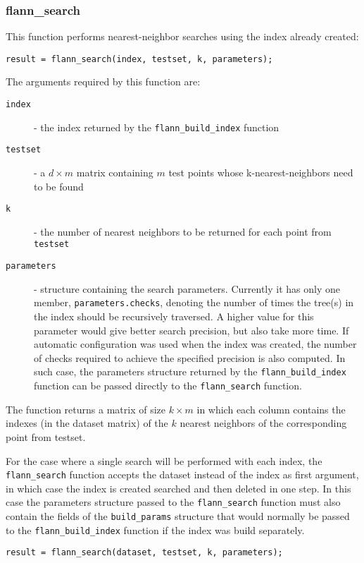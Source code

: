 \documentclass[letter,10pt]{article}
\begin{document}
\subsubsection{flann\_search}

This function performs nearest-neighbor searches using the index already
created:
\begin{Verbatim}
result = flann_search(index, testset, k, parameters);
\end{Verbatim}

The arguments required by this function are:
\begin{description}
\item[\texttt{index}] - the index returned by the
\texttt{flann\_build\_index} function
\item[\texttt{testset}] - a $d \times m$ matrix containing $m$ test points
whose k-nearest-neighbors need to be found
\item[\texttt{k}] - the number of nearest neighbors to be returned for each
point from \texttt{testset}
\item[\texttt{parameters}] - structure containing the search parameters.
Currently it has only one member, \texttt{parameters.checks}, denoting the
number of times the tree(s) in the index should be recursively traversed. A
higher value for this parameter would give better search precision, but
also take more time. If automatic configuration was used when the
index was created, the number of checks required to achieve the specified
precision is also computed. In such case, the parameters structure returned
by the \texttt{flann\_build\_index} function can be passed directly to the
\texttt{flann\_search} function.
\end{description}

The function returns a matrix of size $k \times m$ in which each column contains the indexes (in the dataset matrix) of the $k$ nearest neighbors of the corresponding point from testset.

For the case where a single search will be performed with each index, the
\texttt{flann\_search} function accepts the dataset instead of the index as
first argument, in which case the index is created searched and then
deleted in one step. In this case the parameters structure passed to the
\texttt{flann\_search} function must also contain the fields of the
\texttt{build\_params} structure that would normally be passed to the
\texttt{flann\_build\_index} function if the index was build separately.
\begin{Verbatim}
result = flann_search(dataset, testset, k, parameters);
\end{Verbatim}
\end{document}

